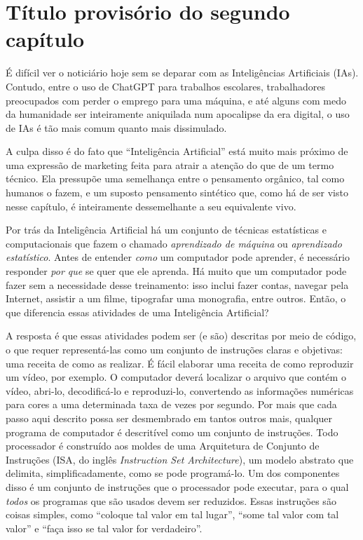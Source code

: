 \chapter{Título provisório do segundo capítulo}
É difícil ver o noticiário hoje sem se deparar com as Inteligências Artificiais (IAs).
Contudo, entre o uso de ChatGPT para trabalhos escolares, trabalhadores preocupados com perder o emprego para uma máquina, e até alguns com medo da humanidade ser inteiramente aniquilada num apocalipse da era digital, o uso de IAs é tão mais comum quanto mais dissimulado.

A culpa disso é do fato que ``Inteligência Artificial'' está muito mais próximo de uma expressão de marketing feita para atrair a atenção do que de um termo técnico.
Ela pressupõe uma semelhança entre o pensamento orgânico, tal como humanos o fazem, e um suposto pensamento sintético que, como há de ser visto nesse capítulo, é inteiramente dessemelhante a seu equivalente vivo.

Por trás da Inteligência Artificial há um conjunto de técnicas estatísticas e computacionais que fazem o chamado \textit{aprendizado de máquina} ou \textit{aprendizado estatístico}.
Antes de entender \textit{como} um computador pode aprender, é necessário responder \textit{por que} se quer que ele aprenda.
Há muito que um computador pode fazer sem a necessidade desse treinamento: isso inclui fazer contas, navegar pela Internet, assistir a um filme, tipografar uma monografia, entre outros.
Então, o que diferencia essas atividades de uma Inteligência Artificial?

A resposta é que essas atividades podem ser (e são) descritas por meio de código, o que requer representá-las como um conjunto de instruções claras e objetivas: uma receita de como as realizar.
É fácil elaborar uma receita de como reproduzir um vídeo, por exemplo.
O computador deverá localizar o arquivo que contém o vídeo, abri-lo, decodificá-lo e reproduzi-lo, convertendo as informações numéricas para cores a uma determinada taxa de vezes por segundo.
Por mais que cada passo aqui descrito possa ser desmembrado em tantos outros mais, qualquer programa de computador é descritível como um conjunto de instruções.
Todo processador é construído aos moldes de uma Arquitetura de Conjunto de Instruções (ISA, do inglês \textit{Instruction Set Architecture}), um modelo abstrato que delimita, simplificadamente, como se pode programá-lo.
Um dos componentes disso é um conjunto de instruções que o processador pode executar, para o qual \textit{todos} os programas que são usados devem ser reduzidos.
Essas instruções são coisas simples, como ``coloque tal valor em tal lugar'', ``some tal valor com tal valor'' e ``faça isso se tal valor for verdadeiro''.

